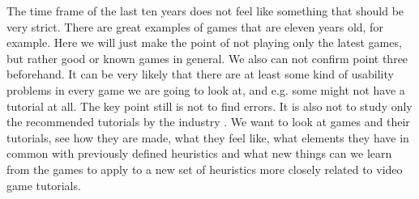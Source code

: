 The time frame of the last ten years does not feel like something that should be very strict. There are great examples of games that are eleven years old, for example. Here we will just make the point of not playing only the latest games, but rather good or known games in general. We also can not confirm point three beforehand. It can be very likely that there are at least some kind of usability problems in every game we are going to look at, and e.g. some might not have a tutorial at all. The key point still is not to find errors. It is also not to study only the recommended tutorials by the industry \cite{Bradley}. We want to look at games and their tutorials, see how they are made, what they feel like, what elements they have in common with previously defined heuristics and what new things can we learn from the games to apply to a new set of heuristics more closely related to video game tutorials.